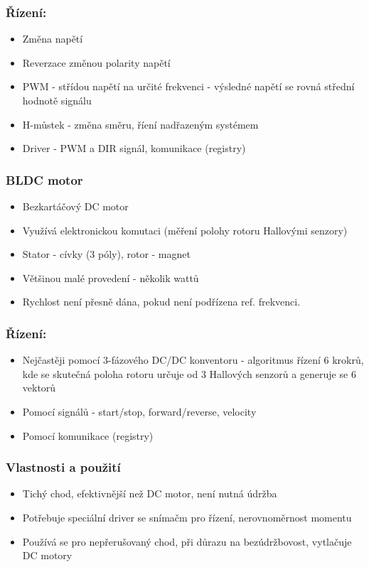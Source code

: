 \subsubsection*{Řízení:}
\begin{itemize}
  \item Změna napětí
  \item Reverzace změnou polarity napětí
  \item PWM - střídou napětí na určité frekvenci - výsledné napětí se rovná střední hodnotě signálu
  \item H-můstek - změna směru, říení nadřazeným systémem
  \item Driver - PWM a DIR signál, komunikace (registry)
\end{itemize}

\subsubsection*{BLDC motor}
\begin{itemize}
  \item Bezkartáčový DC motor
  \item Využívá elektronickou komutaci (měření polohy rotoru Hallovými senzory)
  \item Stator - cívky (3 póly), rotor - magnet
  \item Většinou malé provedení - několik wattů
  \item Rychlost není přesně dána, pokud není podřízena ref. frekvenci.
\end{itemize}

\subsubsection*{Řízení:}
\begin{itemize}
  \item Nejčastěji pomocí 3-fázového DC/DC konventoru - algoritmus řízení 6 krokrů, kde se skutečná poloha rotoru určuje od 3 Hallových senzorů a generuje se 6 vektorů
  \item Pomocí signálů - start/stop, forward/reverse, velocity
  \item Pomocí komunikace (registry)
\end{itemize}

\subsubsection*{Vlastnosti a použití}
\begin{itemize}
  \item Tichý chod, efektivnější než DC motor, není nutná údržba
  \item Potřebuje speciální driver se snímačm pro řízení, nerovnoměrnost momentu
  \item Používá se pro nepřerušovaný chod, při důrazu na bezúdržbovost, vytlačuje DC motory
\end{itemize}

